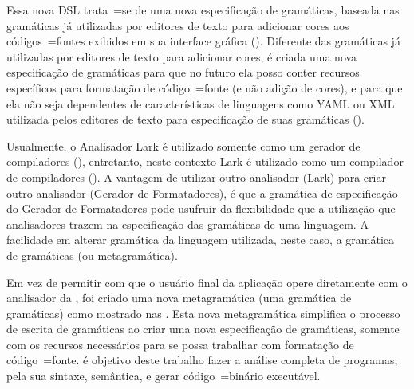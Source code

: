 Essa nova DSL trata~=se de uma nova especificação de gramáticas,
baseada nas gramáticas já utilizadas por editores de texto para adicionar cores aos códigos~=fontes exibidos em sua interface gráfica ().
Diferente das gramáticas já utilizadas por editores de texto para adicionar cores,
é criada uma nova especificação de gramáticas para que no futuro ela posso conter recursos específicos para formatação de código~=fonte (e não adição de cores),
e para que ela não seja dependentes de características de linguagens como YAML ou
XML utilizada pelos editores de texto para especificação de suas gramáticas ().

Usualmente,
o Analisador Lark é utilizado somente como um gerador de compiladores (),
entretanto,
neste contexto Lark é utilizado como um compilador de compiladores ().
A vantagem de utilizar outro analisador (Lark) para criar outro analisador (Gerador de Formatadores),
é que a gramática de especificação do Gerador de Formatadores pode usufruir da flexibilidade que a utilização que analisadores trazem na especificação das gramáticas de uma linguagem.
A facilidade em alterar gramática da linguagem utilizada,
neste caso,
a gramática de gramáticas (ou metagramática).

Em vez de permitir com que o usuário final da aplicação opere diretamente com o analisador da ,
foi criado uma nova metagramática (uma gramática de gramáticas) como mostrado nas .
Esta nova metagramática simplifica o processo de escrita de gramáticas ao criar uma nova especificação de gramáticas,
somente com os recursos necessários para se possa trabalhar com formatação de código~=fonte.
 é objetivo deste trabalho fazer a análise completa de programas,
pela sua sintaxe, semântica,
e gerar código~=binário executável.

